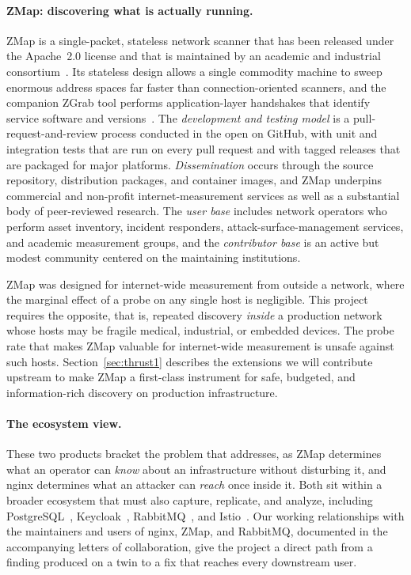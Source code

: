 \paragraph{ZMap: discovering what is actually running.}
ZMap is a single-packet, stateless network scanner that has been released
under the Apache~2.0 license and that is maintained by an academic and
industrial consortium~\cite{zmap,zmapsrc}. Its stateless design allows a
single commodity machine to sweep enormous address spaces far faster than
connection-oriented scanners, and the companion ZGrab tool performs
application-layer handshakes that identify service software and
versions~\cite{zgrab}. The \emph{development and testing model} is a
pull-request-and-review process conducted in the open on GitHub, with unit
and integration tests that are run on every pull request and with tagged
releases that are packaged for major platforms. \emph{Dissemination} occurs
through the source repository, distribution packages, and container images,
and ZMap underpins commercial and non-profit internet-measurement services as
well as a substantial body of peer-reviewed research. The \emph{user base} includes network operators who perform asset inventory,
incident responders, attack-surface-management services, and academic
measurement groups, and the \emph{contributor base} is an active but modest
community centered on the maintaining institutions.

ZMap was designed for internet-wide measurement from outside a network, where
the marginal effect of a probe on any single host is negligible. This project
requires the opposite, that is, repeated discovery \emph{inside} a production
network whose hosts may be fragile medical, industrial, or embedded devices.
The probe rate that makes ZMap valuable for internet-wide measurement is
unsafe against such hosts. Section~\ref{sec:thrust1} describes the extensions we will contribute upstream to make ZMap a first-class instrument for safe, budgeted, and information-rich discovery on production infrastructure.

\paragraph{The ecosystem view.}
These two products bracket the problem that \sysname addresses, as ZMap
determines what an operator can \emph{know} about an infrastructure without
disturbing it, and nginx determines what an attacker can \emph{reach} once
inside it. Both sit within a broader ecosystem that \sysname must also
capture, replicate, and analyze, including PostgreSQL~\cite{postgresql}, Keycloak~\cite{keycloak},
RabbitMQ~\cite{rabbitmq}, and Istio~\cite{istio}. Our working relationships with the maintainers and users of nginx, ZMap, and RabbitMQ, documented in the accompanying letters of collaboration, give the project a direct path from a finding produced on a twin to a fix that reaches every downstream user.
